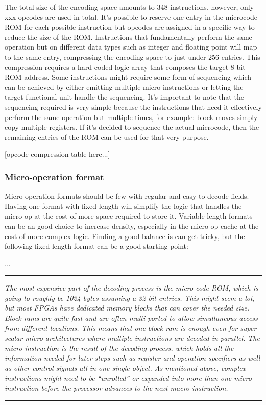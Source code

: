                 The total size of the encoding space amounts to 348 instructions, however, only xxx opcodes are used in total. It's possible to reserve one entry in the microcode ROM for each possible instruction but opcodes are assigned in a specific way to reduce the size of the ROM. Instructions that fundamentally perform the same operation but on different data types such as integer and floating point will map to the same entry, compressing the encoding space to just under 256 entries. This compression requires a hard coded logic array that composes the target 8 bit ROM address. Some instructions might require some form of sequencing which can be achieved by either emitting multiple micro-instructions or letting the target functional unit handle the sequencing. It's important to note that the sequencing required is very simple because the instructions that need it effectively perform the same operation but multiple times, for example: block moves simply copy multiple registers. If it's decided to sequence the actual microcode, then the remaining entries of the ROM can be used for that very purpose.

                [opcode compression table here...]

            \subsubsection{Micro-operation format}

                Micro-operation formats should be few with regular and easy to decode fields. Having one format with fixed length will simplify the logic that handles the micro-op at the cost of more space required to store it. Variable length formats can be an good choice to increase density, especially in the micro-op cache at the cost of more complex logic. Finding a good balance is can get tricky, but the following fixed length format can be a good starting point:

                ...

        \par\noindent\rule{\textwidth}{0.4pt}
        \textit{The most expensive part of the decoding process is the micro-code ROM, which is going to roughly be 1024 bytes assuming a 32 bit entries. This might seem a lot, but most FPGAs have dedicated memory blocks that can cover the needed size. Block rams are quite fast and are often multi-ported to allow simultaneous access from different locations. This means that one block-ram is enough even for super-scalar micro-architectures where multiple instructions are decoded in parallel. The micro-instruction is the result of the decoding process, which holds all the information needed for later steps such as register and operation specifiers as well as other control signals all in one single object. As mentioned above, complex instructions might need to be ``unrolled'' or expanded into more than one micro-instruction before the processor advances to the next macro-instruction.}
        \par\noindent\rule{\textwidth}{0.4pt}